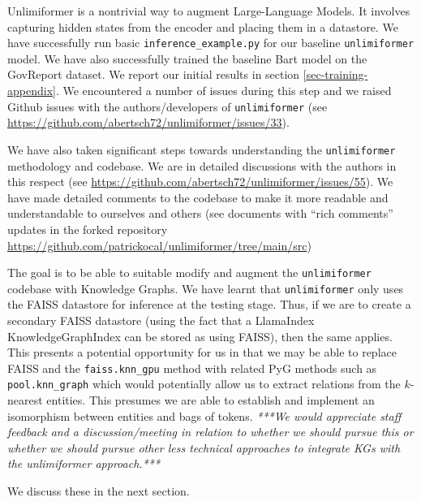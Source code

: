 Unlimiformer \cite{bertsch2023unlimiformer} is a nontrivial way to augment
Large-Language Models. It involves capturing hidden states from the encoder and
placing them in a datastore. We have successfully run basic
\texttt{inference\_example.py} for our baseline \texttt{unlimiformer} model. We
have also successfully trained the baseline Bart model on the GovReport
dataset. We report our initial results in section \ref{sec-training-appendix}.
We encountered a number of issues during this step and we raised Github issues
with the authors/developers of \texttt{unlimiformer} (see
\url{https://github.com/abertsch72/unlimiformer/issues/33}).

We have also taken significant steps towards understanding the
\texttt{unlimiformer} methodology and codebase. We are in detailed discussions
with the authors in this respect (see
\url{https://github.com/abertsch72/unlimiformer/issues/55}). We have made
detailed comments to the codebase to make it more readable and understandable
to ourselves and others (see documents with ``rich comments'' updates in the
forked repository
\url{https://github.com/patrickocal/unlimiformer/tree/main/src})

The goal is to be able to suitable modify and augment the \texttt{unlimiformer}
codebase with Knowledge Graphs. We have learnt that \texttt{unlimiformer} only
uses the FAISS datastore for inference at the testing stage. Thus, if we are to
create a secondary FAISS datastore (using the fact that a LlamaIndex
KnowledgeGraphIndex can be stored as using FAISS), then the same applies. This
presents a potential opportunity for us in that we may be able to replace FAISS
and the \texttt{faiss.knn\_gpu} method with related PyG methods such as 
\texttt{pool.knn\_graph} which would potentially allow us to extract relations
from the $k$-nearest entities. This presumes we are able to establish and
implement an isomorphism between entities and bags of tokens. \emph{***We would
  appreciate staff feedback and a discussion/meeting in relation to whether we
  should pursue this or whether we should pursue other less technical
approaches to integrate KGs with the unlimiformer approach.***} 

We discuss these in the next section.

